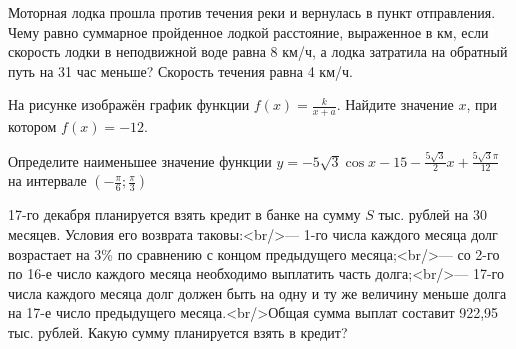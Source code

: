 \begin{taskBN}{9}
Моторная лодка прошла против течения реки и вернулась в пункт отправления. Чему равно суммарное пройденное лодкой расстояние, выраженное в км, если скорость лодки в неподвижной воде равна 8 км/ч, а лодка затратила на обратный путь на 31 час меньше? Скорость течения равна 4 км/ч. 
\end{taskBN}

\begin{taskBN}{10}
На рисунке изображён график функции $f(x)=\frac{k}{x+a}$. Найдите значение $x$, при котором $f(x)=-12$.
\end{taskBN}

\begin{taskBN}{11}
Определите наименьшее значение функции $y = -5\sqrt{3}\cos x-15-\frac{5\sqrt{3}}{2}x+\frac{5\sqrt{3}\pi}{12}$ на интервале $\left(-\frac{\pi}{6};\frac{\pi}{3} \right)$
\end{taskBN}

\begin{taskBN}{12}
17-го декабря планируется взять кредит в банке на сумму $S$ тыс. рублей на 30 месяцев. Условия его возврата таковы:<br/>— 1-го числа каждого месяца долг возрастает на 3\% по сравнению с концом предыдущего месяца;<br/>— со 2-го по 16-е число каждого месяца необходимо выплатить часть долга;<br/>— 17-го числа каждого месяца долг должен быть на одну и ту же величину меньше долга на 17-е число предыдущего месяца.<br/>Общая сумма выплат составит 922,95 тыс. рублей. Какую сумму планируется взять в кредит?
\end{taskBN}

%
%
%
%




